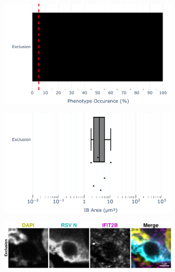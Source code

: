 \begin{figure}
    \begin{subfigure}{0.5\textwidth}
        \caption{}
        \includegraphics[width=1\linewidth]{10. Chapter 5/Figs/02. pIB/03. IFIT2B/01. bar_i2b_293t.pdf} 
    \end{subfigure}
    \begin{subfigure}{0.5\textwidth}
        \caption{}
        \includegraphics[width=1\linewidth]{10. Chapter 5/Figs/02. pIB/03. IFIT2B/02. box_i2b_293t.pdf}
    \end{subfigure}
    \begin{subfigure}{1\textwidth}
        \caption{}
        \includegraphics[width=1\linewidth]{10. Chapter 5/Figs/02. pIB/03. IFIT2B/03. i2b-293t-hnhp.pdf} 

\end{subfigure}
\end{figure}
